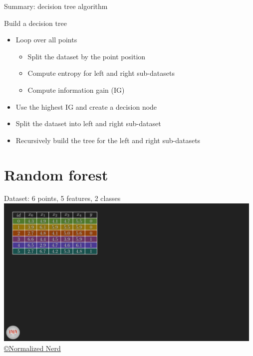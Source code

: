 \documentclass[handout, 10pt]{beamer}
\begin{document}

\begin{frame}{Summary: decision tree algorithm}
\begin{block}{Build a decision tree}
\begin{itemize}
    \item Loop over all points
    \begin{itemize}
        \item Split the dataset by the point position
        \item Compute entropy for left and right sub-datasets
        \item Compute information gain (IG)
    \end{itemize}
    \item Use the highest IG and create a decision node
    \item Split the dataset into left and right sub-dataset
    \item Recursively build the tree for the left and right sub-datasets
\end{itemize}
\end{block}
\end{frame}

\section{Random forest}


\begin{frame}{Dataset: 6 points, 5 features, 2 classes}
\hspace*{-1cm}\includegraphics[width=13cm]{figs/rf/_0-40 screenshot.png}
{\tiny \href{https://www.youtube.com/watch?v=ZVR2Way4nwQ}{ \copyright Normalized Nerd}}
\end{frame}
\end{document}
